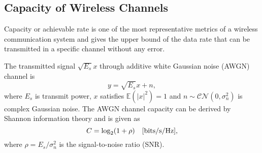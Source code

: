 \subsection{Capacity of Wireless Channels}
Capacity or achievable rate is one of the most representative metrics of a wireless communication system and gives the upper bound 
of the data rate that can be transmitted in a specific channel without any error.

The transmitted signal $\sqrt{E_s}x$ through additive white Gaussian noise (AWGN) channel is
\begin{equation}
    y = \sqrt{E_s}x + n,
\end{equation}
where $E_s$ is transmit power, $x$ satisfies $\mathbb{E}(|x|^2)=1$ and $n \sim \mathcal{CN}(0,\sigma_n^2)$ is complex Gaussian noise.
The AWGN channel capacity can be derived by Shannon information theory and is given as
\begin{equation}
    C = \log_2 (1+\rho) \quad [{\rm bits/s/Hz}],
\end{equation}
where $\rho = E_s/\sigma_n^2$ is the signal-to-noise ratio (SNR).


